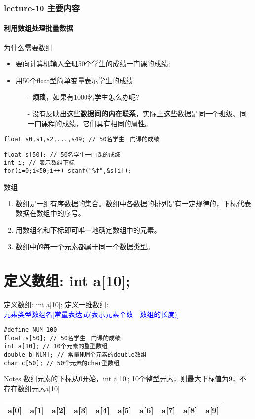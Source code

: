\begin{frame}[shrink]
  \frametitle{lecture-10 主要内容}
  \framesubtitle{利用数组处理批量数据}
  \tableofcontents[hideallsubsections]
\end{frame}

\begin{frame}{为什么需要数组}
\begin{itemize}
	\item 要向计算机输入全班50个学生的成绩一门课的成绩; 
	\item 用50个float型简单变量表示学生的成绩
	\begin{itemize}
		\item[-] \textbf{烦琐}，如果有1000名学生怎么办呢?
		\item[-] 没有反映出这些\textbf{数据间的内在联系}，实际上这些数据是同一个班级、同一门课程的成绩，它们具有相同的属性。
	\end{itemize}
\end{itemize}
\begin{lstlisting}
float s0,s1,s2,...,s49; // 50名学生一门课的成绩
\end{lstlisting}
\pause
\begin{lstlisting}
float s[50]; // 50名学生一门课的成绩
int i; // 表示数组下标
for(i=0;i<50;i++) scanf("%f",&s[i]);
\end{lstlisting}
\begin{block}{数组}
	\begin{enumerate}
		\item 数组是一组有序数据的集合。数组中各数据的排列是有一定规律的，下标代表数据在数组中的序号。
		\item 用数组名和下标即可唯一地确定数组中的元素。
		\item 数组中的每一个元素都属于同一个数据类型。
	\end{enumerate}
\end{block}
\end{frame}

\section{定义数组: int a[10];}

\begin{frame}{定义数组: int a[10];}
定义一维数组: \\
\textcolor{blue}{元素类型\quad 数组名[常量表达式(表示元素个数---数组的长度)]}
\begin{lstlisting}
#define NUM 100
float s[50]; // 50名学生一门课的成绩
int a[10]; // 10个元素的整型数组
double b[NUM]; // 常量NUM个元素的double数组
char c[50]; // 50个元素的char型数组
\end{lstlisting}
\begin{block}{Notes}
	数组元素的下标从0开始，int a[10]; 10个整型元素，则最大下标值为9，不存在数组元素a[10]
\end{block}
\begin{tabular}{|c|c|c|c|c|c|c|c|c|c|}
	\hline 
	a[0] & a[1] & a[2] & a[3] & a[4] & a[5] & a[6] & a[7] & a[8] & a[9] \\ 
	\hline 
\end{tabular} 
\end{frame}

